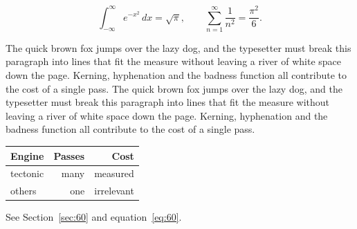 \documentclass{article}
\begin{document}
\begin{equation}\label{eq:60}
\int_{-\infty}^{\infty} e^{-x^{2}}\,dx = \sqrt{\pi}, \qquad
\sum_{n=1}^{\infty} \frac{1}{n^{2}} = \frac{\pi^{2}}{6}.
\end{equation}

The quick brown fox jumps over the lazy dog, and the typesetter must break this paragraph into lines that fit the measure without leaving a river of white space down the page. Kerning, hyphenation and the badness function all contribute to the cost of a single pass. The quick brown fox jumps over the lazy dog, and the typesetter must break this paragraph into lines that fit the measure without leaving a river of white space down the page. Kerning, hyphenation and the badness function all contribute to the cost of a single pass. 

\begin{center}
\begin{tabular}{lrr}
\toprule
Engine & Passes & Cost \\
\midrule
tectonic & many & measured \\
others & one & irrelevant \\
\bottomrule
\end{tabular}
\end{center}

See Section~\ref{sec:60} and equation~\eqref{eq:60}.
\end{document}
